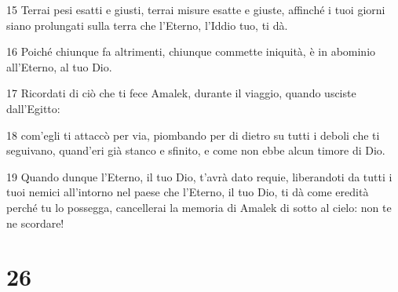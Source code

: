 \par 15 Terrai pesi esatti e giusti, terrai misure esatte e giuste, affinché i tuoi giorni siano prolungati sulla terra che l'Eterno, l'Iddio tuo, ti dà.
\par 16 Poiché chiunque fa altrimenti, chiunque commette iniquità, è in abominio all'Eterno, al tuo Dio.
\par 17 Ricordati di ciò che ti fece Amalek, durante il viaggio, quando usciste dall'Egitto:
\par 18 com'egli ti attaccò per via, piombando per di dietro su tutti i deboli che ti seguivano, quand'eri già stanco e sfinito, e come non ebbe alcun timore di Dio.
\par 19 Quando dunque l'Eterno, il tuo Dio, t'avrà dato requie, liberandoti da tutti i tuoi nemici all'intorno nel paese che l'Eterno, il tuo Dio, ti dà come eredità perché tu lo possegga, cancellerai la memoria di Amalek di sotto al cielo: non te ne scordare!

\chapter{26}

